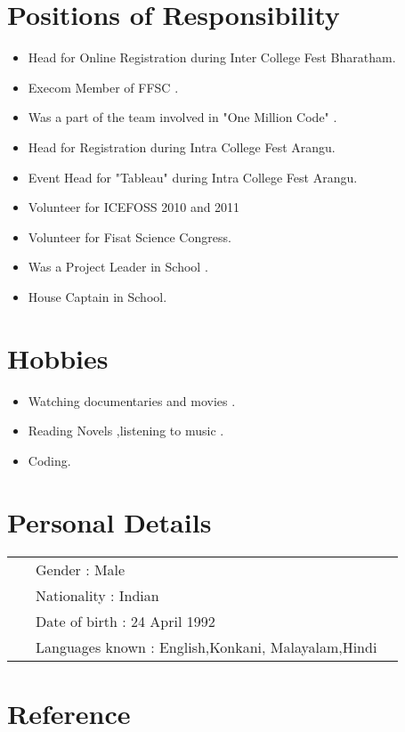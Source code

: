 \documentclass[a4paper]{article}
\begin{document}
\section{Positions of Responsibility}
\begin{itemize}
\item	Head for Online Registration during Inter College Fest Bharatham.
\item	Execom Member of FFSC .
\item	Was a part of the team involved in "One Million Code" .
\item	Head for Registration during Intra College Fest Arangu.
\item	Event Head for "Tableau" during Intra College Fest Arangu.
\item	Volunteer for ICEFOSS 2010 and 2011
\item	Volunteer for Fisat Science Congress.
\item	Was a Project Leader in School .
\item	House Captain in School.

\end{itemize}

\section{Hobbies}
\begin{itemize}
\item	Watching documentaries and movies .
\item	Reading Novels ,listening to music .
\item	Coding.
\end{itemize}


\section{Personal Details}
\begin{flushleft}
\begin{tabular}{ll}
\indent \ \ \ Gender :  Male \\
\indent  \ \ \   Nationality : Indian\\
\indent   \ \  \ Date of birth : 24 April 1992 \\
\indent \ \ \   Languages known  : English,Konkani, Malayalam,Hindi
\end{tabular}
\end{flushleft}

\section{Reference}
\end{document}
